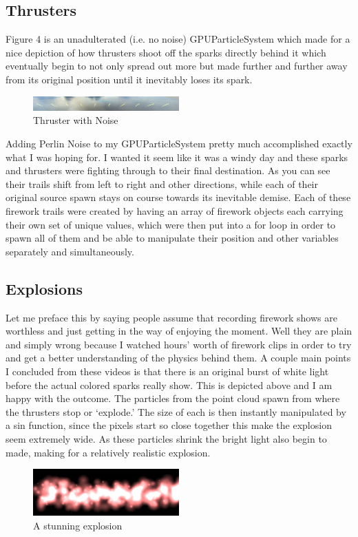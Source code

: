 \subsection{Thrusters}
Figure 4 is an unadulterated (i.e. no noise) GPUParticleSystem which made for a nice depiction of
how thrusters shoot off the sparks directly behind it which eventually begin to not only spread
out more but made further and further away from its original position until it inevitably loses its
spark.
\begin{figure}
\includegraphics[width=0.5\textwidth]{eric2}
\caption{Thruster with Noise}
\end{figure}
Adding Perlin Noise to my GPUParticleSystem pretty much accomplished exactly what I was
hoping for. I wanted it seem like it was a windy day and these sparks and thrusters were fighting
through to their final destination. As you can see their trails shift from left to right and other
directions, while each of their original source spawn stays on course towards its inevitable
demise. Each of these firework trails were created by having an array of firework objects each
carrying their own set of unique values, which were then put into a for loop in order to spawn all
of them and be able to manipulate their position and other variables separately and
simultaneously.

\subsection{Explosions}
Let me preface this by saying people assume that recording firework shows are worthless and
just getting in the way of enjoying the moment. Well they are plain and simply wrong because I
watched hours’ worth of firework clips in order to try and get a better understanding of the
physics behind them. A couple main points I concluded from these videos is that there is an
original burst of white light before the actual colored sparks really show. This is depicted above
and I am happy with the outcome. The particles from the point cloud spawn from where the
thrusters stop or ‘explode.’ The size of each is then instantly manipulated by a sin function, since
the pixels start so close together this make the explosion seem extremely wide. As these particles
shrink the bright light also begin to made, making for a relatively realistic explosion.
\begin{figure}
\includegraphics[width=0.5\textwidth]{eric3}
\caption{A stunning explosion}
\end{figure}

